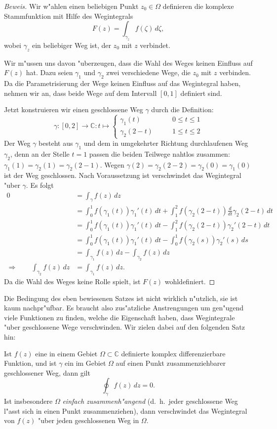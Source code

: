 \begin{proof}[Beweis]
Wir w"ahlen einen beliebigen Punkt $z_0\in\Omega$ definieren die
komplexe Stammfunktion mit Hilfe des Wegintegrals
\[
F(z)=\int_{\gamma_z} f(\zeta)\,d\zeta,
\]
wobei $\gamma_z$ ein beliebiger Weg ist, der $z_0$ mit $z$ verbindet.

Wir m"ussen uns davon "uberzeugen, dass die Wahl des Weges keinen Einfluss
auf $F(z)$ hat.
Dazu seien $\gamma_1$ und $\gamma_2$ zwei verschiedene Wege, die
$z_0$ mit $z$ verbinden.
Da die Parametrisierung der Wege keinen Einfluss auf das Wegintegral haben,
nehmen wir an, dass beide Wege auf dem Intervall $[0,1]$ definiert sind.

Jetzt konstruieren wir einen geschlossene Weg $\gamma$ durch die
Definition:
\[
\gamma\colon[0,2]\to\mathbb C:t\mapsto
\begin{cases}
\gamma_1(t)&\qquad 0\le t\le 1\\
\gamma_2(2-t)&\qquad 1\le t\le 2
\end{cases}
\]
Der Weg $\gamma$ besteht aus $\gamma_1$ und dem in umgekehrter Richtung
durchlaufenen Weg $\gamma_2$, denn an der Stelle $t=1$ passen die
beiden Teilwege nahtlos zusammen: $\gamma_1(1)=\gamma_2(1)=\gamma_2(2-1)$.
Wegen $\gamma(2)=\gamma_2(2-2)=\gamma_2(0)=\gamma_1(0)$ ist der
Weg geschlossen.
Nach Voraussetzung ist verschwindet das Wegintegral "uber $\gamma$.
Es folgt
\begin{align*}
0
&=
\int_{\gamma}f(z)\,dz
\\
&=
\int_0^1 f(\gamma_1(t))\gamma_1'(t)\,dt
+ \int_1^2f(\gamma_2(2-t))\frac{d}{dt}\gamma_2(2-t)\,dt
\\
&=
\int_0^1 f(\gamma_1(t))\gamma_1'(t)\,dt
- \int_1^2f(\gamma_2(2-t))\gamma_2'(2-t)\,dt
\\
&=
\int_0^1 f(\gamma_1(t))\gamma_1'(t)\,dt
- \int_0^1f(\gamma_2(s))\gamma_2'(s)\,ds
\\
&=
\int_{\gamma_1}f(z)\,dz - \int_{\gamma_2}f(z)\,dz
\\
\Rightarrow\qquad
\int_{\gamma_2}f(z)\,dz&=\int_{\gamma_1}f(z)\,dz.
\end{align*}
Da die Wahl des Weges keine Rolle spielt, ist $F(z)$ wohldefiniert.
\end{proof}

Die Bedingung des eben bewiesenen Satzes ist nicht wirklich n"utzlich,
sie ist kaum nachpr"ufbar.
Es braucht also zus"atzliche Anstrengungen um gen"ugend viele
Funktionen zu finden, welche die Eigenschaft haben, dass Wegintegrale
"uber geschlossene Wege verschwinden.
Wir zielen dabei auf den folgenden Satz hin:
\begin{satz}[Cauchy]
Ist $f(z)$ eine in einem Gebiet $\Omega\subset\mathbb C$ definierte
komplex differenzierbare Funktion, und ist $\gamma$ ein im Gebiet
$\Omega$ auf einen Punkt zusammenziehbarer geschlossener Weg, dann gilt
\[
\oint_{\gamma}f(z)\,dz=0.
\]
Ist insbesondere $\Omega$ {\em einfach zusammenh"angend}
%
%
(d.~h.~jeder geschlossene Weg l"asst sich in einen Punkt zusammenziehen),
dann verschwindet das Wegintegral von $f(z)$ "uber jeden geschlossenen
Weg in $\Omega$.
\end{satz}

